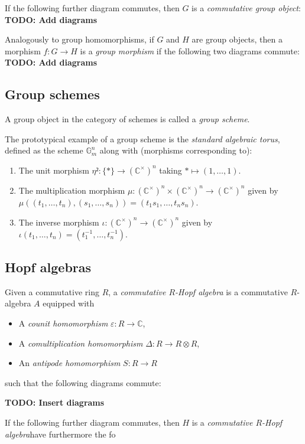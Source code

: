\documentclass{article}
\begin{document}
If the following further diagram commutes, then $G$ is a \emph{commutative group object}:
{\bf TODO: Add diagrams}

Analogously to group homomorphisms, if $G$ and $H$ are group objects,
then a morphism $f : G \to H$ is a \emph{group morphism} if the following two diagrams commute:
{\bf TODO: Add diagrams}


\subsection{Group schemes}


A group object in the category of schemes is called a \emph{group scheme}.

The prototypical example of a group scheme is the \emph{standard algebraic torus},
defined as the scheme $\mathbb G_m^n$ along with (morphisms corresponding to):
\begin{enumerate}
  \item The unit morphism $\eta ²: \{*\} \to (\mathbb C^\times)^n$ taking $* \mapsto (1, \dots, 1)$.
  \item The multiplication morphism $\mu : (\mathbb C^\times)^n \times (\mathbb C^\times)^n \to (\mathbb C^\times)^n$
  given by $\mu((t_1, \dots, t_n),(s_1, \dots, s_n)) = (t_1s_1, \dots, t_n s_n)$.
  \item The inverse morphism $\iota : (\mathbb C^\times)^n \to (\mathbb C^\times)^n$
  given by $\iota(t_1, \dots, t_n) = (t_1^{-1}, \dots, t_n^{-1})$.
\end{enumerate}


\subsection{Hopf algebras}


Given a commutative ring $R$, a \emph{commutative $R$-Hopf algebra}
is a commutative $R$-algebra $A$ equipped with
\begin{itemize}
  \item A \emph{counit homomorphism} $\varepsilon: R\to\mathbb{C}$,
  \item A \emph{comultiplication homomorphism} $\Delta: R \to R \otimes R$,
  \item An \emph{antipode homomorphism} $S: R \to R$
\end{itemize}
such that the following diagrams commute:

{\bf TODO: Insert diagrams}

If the following further diagram commutes, then $H$ is a \emph{commutative $R$-Hopf algebra}have furthermore the fo
\end{document}

